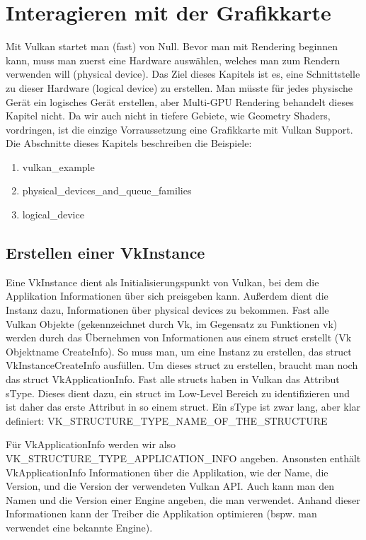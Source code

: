 \documentclass[11pt,a4paper]{report}
\begin{document}
\chapter{Interagieren mit der Grafikkarte}
Mit Vulkan startet man (fast) von Null. Bevor man mit Rendering beginnen kann, muss man zuerst eine Hardware auswählen, welches man zum Rendern verwenden will (physical device). Das Ziel dieses Kapitels ist es, eine Schnittstelle zu dieser Hardware (logical device) zu erstellen. Man müsste für jedes physische Gerät ein logisches Gerät erstellen, aber Multi-GPU Rendering behandelt dieses Kapitel nicht. Da wir auch nicht in tiefere Gebiete, wie Geometry Shaders, vordringen, ist die einzige Vorraussetzung eine Grafikkarte mit Vulkan Support.\\
Die Abschnitte dieses Kapitels beschreiben die Beispiele:
\begin{enumerate}
	\item vulkan\_example
	\item physical\_devices\_and\_queue\_families
	\item logical\_device
\end{enumerate}

\section{Erstellen einer VkInstance}
Eine VkInstance dient als Initialisierungspunkt von Vulkan, bei dem die Applikation Informationen über sich preisgeben kann. Außerdem dient die Instanz dazu, Informationen über physical devices zu bekommen. Fast alle Vulkan Objekte (gekennzeichnet durch Vk, im Gegensatz zu Funktionen vk) werden durch das Übernehmen von Informationen aus einem struct erstellt (Vk Objektname CreateInfo). So muss man, um eine Instanz zu erstellen, das struct VkInstanceCreateInfo ausfüllen. Um dieses struct zu erstellen, braucht man noch das struct VkApplicationInfo.
Fast alle structs haben in Vulkan das Attribut sType. Dieses dient dazu, ein struct im Low-Level Bereich zu identifizieren und ist daher das erste Attribut in so einem struct. Ein sType ist zwar lang, aber klar definiert: VK\_STRUCTURE\_TYPE\_NAME\_OF\_THE\_STRUCTURE

Für VkApplicationInfo werden wir also VK\_STRUCTURE\_TYPE\_APPLICATION\_INFO angeben.
Ansonsten enthält VkApplicationInfo Informationen über die Applikation, wie der Name, die Version, und die Version der verwendeten Vulkan API. Auch kann man den Namen und die Version einer Engine angeben, die man verwendet. Anhand dieser Informationen kann der Treiber die Applikation optimieren (bspw. man verwendet eine bekannte Engine).
\end{document}
